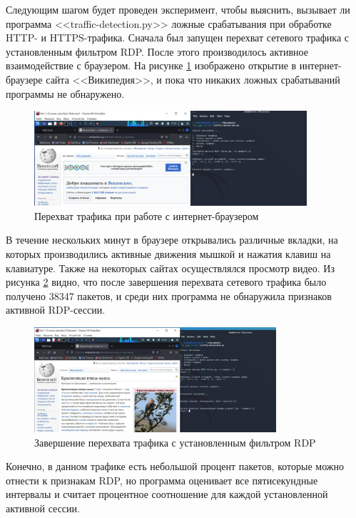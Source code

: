 \documentclass[bachelor, och, coursework]{SCWorks}
\begin{document}
Следующим шагом будет проведен эксперимент, чтобы выяснить, вызывает ли программа <<traffic-detection.py>> ложные срабатывания 
при обработке HTTP- и HTTPS-трафика. Сначала был запущен перехват сетевого трафика с установленным фильтром RDP. После этого
производилось активное взаимодействие с браузером. На рисунке \ref{http} изображено открытие в интернет-браузере сайта <<Википедия>>, и
пока что никаких ложных срабатываний программы не обнаружено.

\begin{figure}[H]
  \centering
  \includegraphics[width=0.9\textwidth]{photo/http.jpg}
  \caption{Перехват трафика при работе с интернет-браузером}
  \label{http}
\end{figure}

В течение нескольких минут в браузере открывались различные вкладки, на которых производились активные движения мышкой и
нажатия клавиш на клавиатуре. Также на некоторых сайтах осуществлялся просмотр видео. 
Из рисунка \ref{http1} видно, что после завершения перехвата сетевого трафика было получено 38347 пакетов, и среди них программа 
не обнаружила признаков активной RDP-сессии. 

\begin{figure}[H]
  \centering
  \includegraphics[width=0.8\textwidth]{photo/http2.jpg}
  \caption{Завершение перехвата трафика с установленным фильтром RDP}
  \label{http1}
\end{figure}

Конечно, в данном трафике есть небольшой процент пакетов, которые можно отнести к признакам RDP,
но программа оценивает все пятисекундные интервалы и считает процентное соотношение для каждой установленной активной сессии.
\end{document}
